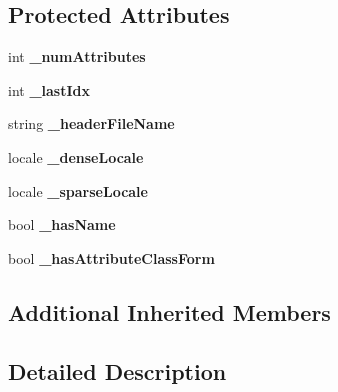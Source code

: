 \subsection*{Protected Attributes}
\begin{DoxyCompactItemize}
\item 
\hypertarget{classMultiBoost_1_1ArffParser_a4f03f38dd92f4b91d39d10a9818a384a}{int {\bfseries \-\_\-num\-Attributes}}\label{classMultiBoost_1_1ArffParser_a4f03f38dd92f4b91d39d10a9818a384a}

\item 
\hypertarget{classMultiBoost_1_1ArffParser_af75c25eacad6708f6eb8c5c1931c789c}{int {\bfseries \-\_\-last\-Idx}}\label{classMultiBoost_1_1ArffParser_af75c25eacad6708f6eb8c5c1931c789c}

\item 
\hypertarget{classMultiBoost_1_1ArffParser_a82590673bd0a20e5730dea9af90265af}{string {\bfseries \-\_\-header\-File\-Name}}\label{classMultiBoost_1_1ArffParser_a82590673bd0a20e5730dea9af90265af}

\item 
\hypertarget{classMultiBoost_1_1ArffParser_a9d6325db0dcb662b8eac43f90475609b}{locale {\bfseries \-\_\-dense\-Locale}}\label{classMultiBoost_1_1ArffParser_a9d6325db0dcb662b8eac43f90475609b}

\item 
\hypertarget{classMultiBoost_1_1ArffParser_aaa43065735b78b6013d742ad36b80703}{locale {\bfseries \-\_\-sparse\-Locale}}\label{classMultiBoost_1_1ArffParser_aaa43065735b78b6013d742ad36b80703}

\item 
\hypertarget{classMultiBoost_1_1ArffParser_abc27dd8144ce5c86a2fabc517cee154f}{bool {\bfseries \-\_\-has\-Name}}\label{classMultiBoost_1_1ArffParser_abc27dd8144ce5c86a2fabc517cee154f}

\item 
\hypertarget{classMultiBoost_1_1ArffParser_afb75e4d4406863248b9d23458c928959}{bool {\bfseries \-\_\-has\-Attribute\-Class\-Form}}\label{classMultiBoost_1_1ArffParser_afb75e4d4406863248b9d23458c928959}

\end{DoxyCompactItemize}
\subsection*{Additional Inherited Members}


\subsection{Detailed Description}


